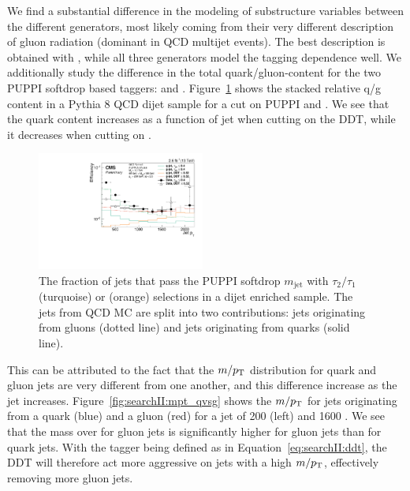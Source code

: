 We find a substantial difference in the modeling of substructure variables between the different generators, most likely coming from their very different description of gluon radiation (dominant in QCD multijet events).
The best description is obtained with \HERWIG{++}, while all three generators model the tagging \PT dependence well.
We additionally study the difference in the total quark/gluon-content for the two PUPPI softdrop based taggers: \nsubj and \ddt. Figure~\ref{fig:searchII:qgfakerate} shows the stacked relative q/g content in a Pythia 8 QCD dijet sample for a cut on PUPPI \nsubj and \ddt. We see that the quark content increases as a function of jet \PT when cutting on the DDT, while it decreases when cutting on \nsubj.
\begin{figure}[h!]
\centering
\includegraphics[width=0.49\textwidth]{figures/vtagging/JME-16-003/BoostedW/qgFakeRate_Pythia8_pT.pdf}
\caption{ 
The fraction of jets that pass the PUPPI softdrop $m_{\mathrm{jet}}$ with $\tau_2/\tau_1$ (turquoise) or \ddt (orange) selections in a dijet enriched sample. The jets from QCD MC are split into two contributions: jets originating from gluons (dotted line) and jets originating from quarks (solid line).}
\label{fig:searchII:qgfakerate}
\end{figure}
 This can be attributed to the fact that the $m/p_{\mathrm{T}}$ distribution for quark and gluon jets are very different from one another, and this difference increase as the jet \PT increases. Figure~\ref{fig:searchII:mpt_qvsg} shows the $m/p_{\mathrm{T}}$ for jets originating from a quark (blue) and a gluon (red) for a jet \PT of 200 \GeV (left) and 1600 \GeV. We see that the mass over \PT for gluon jets is significantly higher for gluon jets than for quark jets.
 With the \ddt tagger being defined as in Equation~\ref{eq:searchII:ddt}, the DDT will therefore act more aggressive on jets with a high $m/p_{\mathrm{T}}$, effectively removing more gluon jets.
